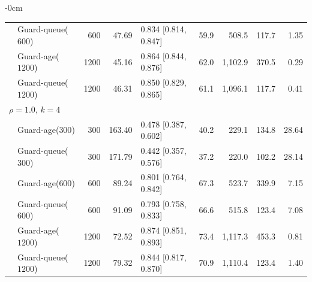 \documentclass[mathematics,supfile,submit,moreauthors]{Definitions/mdpi}
\newcommand{\devnum}[1]{#1}
\begin{document}
\begin{table}[H]
\begin{adjustwidth}{-\extralength}{0cm}
\begin{tabular}{llrrlrrrr}
 & Guard-queue($\devnum{600}$) & \devnum{600} & \devnum{47.69} & \devnum{0.834 [0.814, 0.847]} & \devnum{59.9} & \devnum{508.5} & \devnum{117.7} & \devnum{1.35} \\
 & Guard-age($\devnum{1200}$) & \devnum{1200} & \devnum{45.16} & \devnum{0.864 [0.844, 0.876]} & \devnum{62.0} & \devnum{1{,}102.9} & \devnum{370.5} & \devnum{0.29} \\
 & Guard-queue($\devnum{1200}$) & \devnum{1200} & \devnum{46.31} & \devnum{0.850 [0.829, 0.865]} & \devnum{61.1} & \devnum{1{,}096.1} & \devnum{117.7} & \devnum{0.41} \\
\midrule
\multicolumn{9}{l}{$\rho = 1.0$, $k = 4$} \\
 & Guard-age($\devnum{300}$)  & \devnum{300} & \devnum{163.40} & \devnum{0.478 [0.387, 0.602]} & \devnum{40.2} & \devnum{229.1} & \devnum{134.8} & \devnum{28.64} \\
 & Guard-queue($\devnum{300}$) & \devnum{300} & \devnum{171.79} & \devnum{0.442 [0.357, 0.576]} & \devnum{37.2} & \devnum{220.0} & \devnum{102.2} & \devnum{28.14} \\
 & Guard-age($\devnum{600}$)  & \devnum{600} & \devnum{89.24} & \devnum{0.801 [0.764, 0.842]} & \devnum{67.3} & \devnum{523.7} & \devnum{339.9} & \devnum{7.15} \\
 & Guard-queue($\devnum{600}$) & \devnum{600} & \devnum{91.09} & \devnum{0.793 [0.758, 0.833]} & \devnum{66.6} & \devnum{515.8} & \devnum{123.4} & \devnum{7.08} \\
 & Guard-age($\devnum{1200}$) & \devnum{1200} & \devnum{72.52} & \devnum{0.874 [0.851, 0.893]} & \devnum{73.4} & \devnum{1{,}117.3} & \devnum{453.3} & \devnum{0.81} \\
 & Guard-queue($\devnum{1200}$) & \devnum{1200} & \devnum{79.32} & \devnum{0.844 [0.817, 0.870]} & \devnum{70.9} & \devnum{1{,}110.4} & \devnum{123.4} & \devnum{1.40} \\
\bottomrule
\end{tabular}
\end{adjustwidth}
\end{table}
\end{document}
